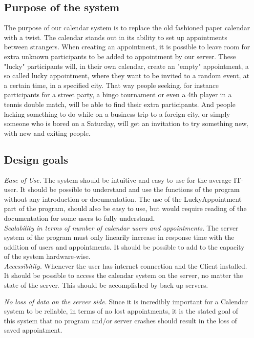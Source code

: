 \subsection{Purpose of the system}
The purpose of our calendar system is to replace the old fashioned paper calendar with a twist. The calendar stands out in its ability to set up appointments between strangers. When creating an appointment, it is possible to leave room for extra unknown participants to be added to appointment by our server. These "lucky" participants will, in their own calendar, create an "empty" appointment, a so called lucky appointment, where they want to be invited to a random event, at a certain time, in a specified city. That way people seeking, for instance participants for a street party, a bingo tournament or even a 4th player in a tennis double match, will be able to find their extra participants. And people lacking something to do while on a business trip to a foreign city, or simply someone who is bored on a Saturday, will get an invitation to try something new, with new and exiting people.
\subsection{Design goals}
\textit{Ease of Use.} The system should be intuitive and easy to use for the average IT-user. It should be possible to understand and use the functions of the program without any introduction or documentation. The use of the LuckyAppointment part of the program, should also be easy to use, but would require reading of the documentation for some users to fully understand.\\

\textit{Scalability in terms of number of calendar users and appointments.} The server system of the program must only linearily increase in response time with the addition of users and appointments. It should be possible to add to the capacity of the system hardware-wise. \\

\textit{Accessibility.} Whenever the user has internet connection and the Client installed. It should be possible to access the calendar system on the server, no matter the state of the server. This should be accomplished by back-up servers.

\textit{No loss of data on the server side.} Since it is incredibly important for a Calendar system to be reliable, in terms of no lost appointments, it is the stated goal of this system that no program and/or server crashes should result in the loss of saved appointment.\\

